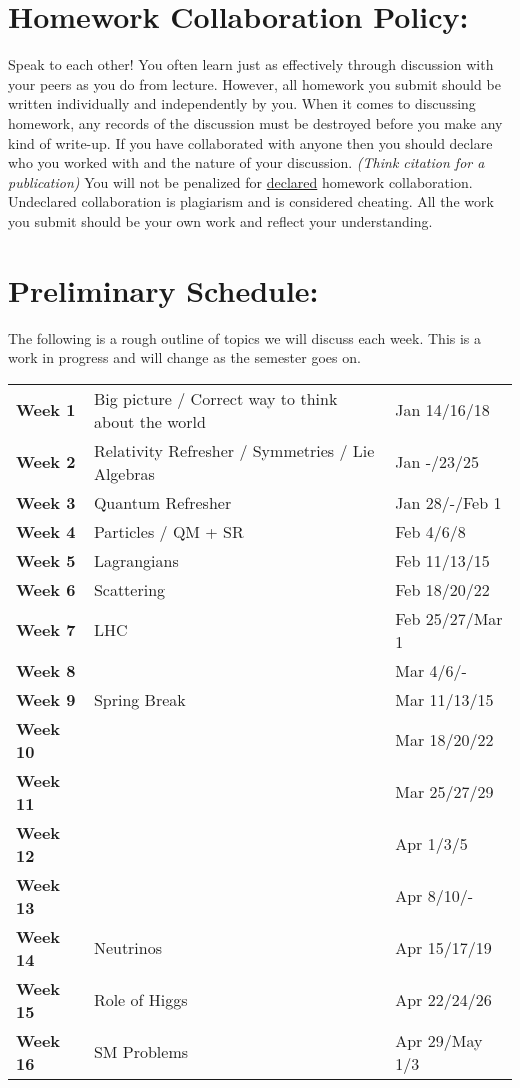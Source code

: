 \documentclass[margin,line]{res}
\begin{document}
\begin{resume}
\section{Homework Collaboration Policy:} 

Speak to each other!
You often learn just as effectively through discussion with your peers as you do from lecture. 
However, all homework you submit should be written individually and independently by you.
When it comes to discussing homework, any records of the discussion must be destroyed before you make any kind of write-up. 
If you have collaborated with anyone then you should declare who you worked with and the nature of your discussion. 
\textit{(Think citation for a publication)}
You will not be penalized for \underline{declared} homework collaboration. 
Undeclared collaboration is plagiarism and is considered cheating. 
All the work you submit should be your own work and reflect your understanding.


\section{Preliminary Schedule:}

The following is a rough outline of topics we will discuss each week. 
This is a work in progress and will change as the semester goes on.

\begin{tabular}{lll}
\textbf{Week 1}  & Big picture / Correct way to think about the world & Jan 14/16/18 \\
\textbf{Week 2}  & Relativity Refresher / Symmetries /  Lie Algebras & Jan -/23/25 \\
\textbf{Week 3}  & Quantum Refresher  & Jan 28/-/Feb 1 \\
\textbf{Week 4}  & Particles / QM + SR & Feb 4/6/8\\
\textbf{Week 5}  & Lagrangians & Feb 11/13/15\\
\textbf{Week 6}  & Scattering  & Feb 18/20/22\\
\textbf{Week 7}  & LHC  & Feb 25/27/Mar 1\\
\textbf{Week 8}  &  & Mar 4/6/- \\
\textbf{Week 9}  & Spring Break & Mar 11/13/15\\
\textbf{Week 10} &  & Mar 18/20/22 \\
\textbf{Week 11} &  & Mar 25/27/29\\
\textbf{Week 12} &  & Apr 1/3/5\\
\textbf{Week 13} &  & Apr 8/10/-\\
\textbf{Week 14} & Neutrinos & Apr 15/17/19\\
\textbf{Week 15} & Role of Higgs & Apr 22/24/26\\
\textbf{Week 16} & SM Problems  & Apr 29/May 1/3\\
\end{tabular}

\end{resume}
\end{document}
